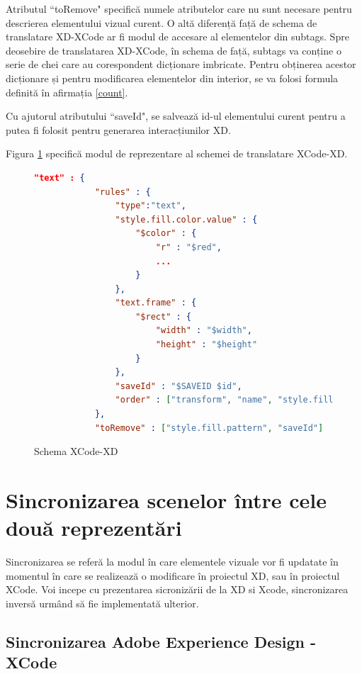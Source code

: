 Atributul ``toRemove" specifică numele atributelor care nu sunt necesare pentru descrierea elementului vizual curent.
O altă diferență față de schema de translatare XD-XCode ar fi modul de accesare al elementelor din subtags.
Spre deosebire de translatarea XD-XCode, în schema de față, subtags va conține o serie de chei care au corespondent dicționare imbricate. Pentru obținerea acestor dicționare și pentru modificarea elementelor din interior, se va folosi formula definită în afirmația \ref{count}.

Cu ajutorul atributului ``saveId", se salvează id-ul elementului curent pentru a putea fi folosit pentru generarea interacțiunilor XD.

Figura \ref{fig:Schema2} specifică modul de reprezentare al schemei de translatare XCode-XD.

\begin{figure}[!htbp]
\begin{lstlisting}[language=json,firstnumber=1]
 "text" : {
            "rules" : {
                "type":"text",
                "style.fill.color.value" : {
                    "$color" : {
                        "r" : "$red",
                        ...
                    }
                },
                "text.frame" : {
                    "$rect" : {
                        "width" : "$width",
                        "height" : "$height"
                    }
                },
                "saveId" : "$SAVEID $id",
                "order" : ["transform", "name", "style.fill.color.value", "style.font", "text.frame", "text.rawText", "meta.ux.rangedStyles", "text.paragraphs", "saveId"]
            },
            "toRemove" : ["style.fill.pattern", "saveId"] 
\end{lstlisting}
\caption{Schema XCode-XD} \label{fig:Schema2}
\end{figure}

\section{Sincronizarea scenelor între cele două reprezentări}

Sincronizarea se referă la modul în care elementele vizuale vor fi updatate în momentul în care se realizează o modificare în proiectul XD, sau în proiectul XCode.
Voi incepe cu prezentarea sicronizării de la XD si Xcode, sincronizarea inversă urmând să fie implementată ulterior.

\subsection{Sincronizarea Adobe Experience Design - XCode}

